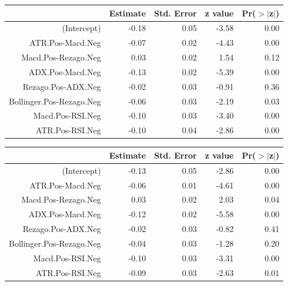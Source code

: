 \documentclass[a4paper,12pt]{Latex/Classes/PhDthesisPSnPDF}
\begin{document}
\begin{center}
\begin{table}[ht]
\centering
\begin{tabular}{rrrrr}
  \hline
 & Estimate & Std. Error & z value & Pr($>$$|$z$|$) \\ 
  \hline
(Intercept) & -0.18 & 0.05 & -3.58 & 0.00 \\ 
  ATR.Pos-Macd.Neg & -0.07 & 0.02 & -4.43 & 0.00 \\ 
  Macd.Pos-Rezago.Neg & 0.03 & 0.02 & 1.54 & 0.12 \\ 
  ADX.Pos-Macd.Neg & -0.13 & 0.02 & -5.39 & 0.00 \\ 
  Rezago.Pos-ADX.Neg & -0.02 & 0.03 & -0.91 & 0.36 \\ 
  Bollinger.Pos-Rezago.Neg & -0.06 & 0.03 & -2.19 & 0.03 \\ 
  Macd.Pos-RSI.Neg & -0.10 & 0.03 & -3.40 & 0.00 \\ 
  ATR.Pos-RSI.Neg & -0.10 & 0.04 & -2.86 & 0.00 \\ 
   \hline
\end{tabular}
\end{table}\end{center}

\begin{center}
\begin{table}[ht]
\centering
\begin{tabular}{rrrrr}
  \hline
 & Estimate & Std. Error & z value & Pr($>$$|$z$|$) \\ 
  \hline
(Intercept) & -0.13 & 0.05 & -2.86 & 0.00 \\ 
  ATR.Pos-Macd.Neg & -0.06 & 0.01 & -4.61 & 0.00 \\ 
  Macd.Pos-Rezago.Neg & 0.03 & 0.02 & 2.03 & 0.04 \\ 
  ADX.Pos-Macd.Neg & -0.12 & 0.02 & -5.58 & 0.00 \\ 
  Rezago.Pos-ADX.Neg & -0.02 & 0.03 & -0.82 & 0.41 \\ 
  Bollinger.Pos-Rezago.Neg & -0.04 & 0.03 & -1.28 & 0.20 \\ 
  Macd.Pos-RSI.Neg & -0.10 & 0.03 & -3.31 & 0.00 \\ 
  ATR.Pos-RSI.Neg & -0.09 & 0.03 & -2.63 & 0.01 \\ 
   \hline
\end{tabular}
\end{table}\end{center}
\end{document}
